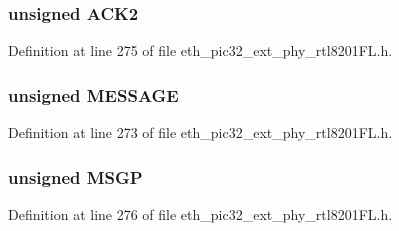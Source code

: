 \hypertarget{union_____a_n_n_p_t_rbits__t_a04eefaff71d440a3996c7db3676475ba}{}
\subsubsection[{A\+C\+K2}]{\setlength{\rightskip}{0pt plus 5cm}unsigned A\+C\+K2}\label{union_____a_n_n_p_t_rbits__t_a04eefaff71d440a3996c7db3676475ba}


Definition at line 275 of file eth\+\_\+pic32\+\_\+ext\+\_\+phy\+\_\+rtl8201\+F\+L.\+h.

\hypertarget{union_____a_n_n_p_t_rbits__t_a06361005f0d2faefe34e0bdb1499bfe7}{}
\subsubsection[{M\+E\+S\+S\+A\+G\+E}]{\setlength{\rightskip}{0pt plus 5cm}unsigned M\+E\+S\+S\+A\+G\+E}\label{union_____a_n_n_p_t_rbits__t_a06361005f0d2faefe34e0bdb1499bfe7}


Definition at line 273 of file eth\+\_\+pic32\+\_\+ext\+\_\+phy\+\_\+rtl8201\+F\+L.\+h.

\hypertarget{union_____a_n_n_p_t_rbits__t_a8c958300dd9e82d064f59696a78d8e45}{}
\subsubsection[{M\+S\+G\+P}]{\setlength{\rightskip}{0pt plus 5cm}unsigned M\+S\+G\+P}\label{union_____a_n_n_p_t_rbits__t_a8c958300dd9e82d064f59696a78d8e45}


Definition at line 276 of file eth\+\_\+pic32\+\_\+ext\+\_\+phy\+\_\+rtl8201\+F\+L.\+h.

\hypertarget{union_____a_n_n_p_t_rbits__t_ac89729be1dc289730931f8238a316516}{}
